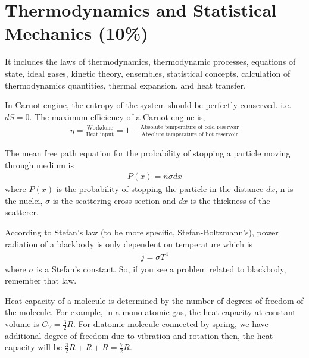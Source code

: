 
\section{Thermodynamics and Statistical Mechanics (10\%)}

It includes the laws of thermodynamics, thermodynamic processes, equations of state, ideal gases, kinetic theory, ensembles, statistical concepts, calculation of thermodynamics quantities, thermal expansion, and heat transfer.


In Carnot engine, the entropy of the system should be perfectly conserved. i.e. $dS = 0$. The maximum efficiency of a Carnot engine is,
\begin{align}
\eta = \frac{\text{Workdone}}{\text{Heat input}} = 1 - \frac{\text{Absolute temperature of cold reservoir}}{\text{Absolute temperature of hot reservoir}}
\end{align}

The mean free path equation for the probability of stopping a particle moving through medium is
\begin{align}
P(x) = n \sigma dx
\end{align}
where $P(x)$ is the probability of stopping the particle in the distance $dx$, n is the nuclei, $\sigma$ is the scattering cross section and $dx$ is the thickness of the scatterer.

According to Stefan's law (to be more specific, Stefan-Boltzmann's), power radiation of a blackbody is only dependent on temperature which is
\begin{align}
j = \sigma T^{4}
\end{align}
where $\sigma$ is a Stefan's constant. So, if you see a problem related to blackbody, remember that law.

Heat capacity of a molecule is determined by the number of degrees of freedom of the molecule. For example, in a mono-atomic gas, the heat capacity at constant volume is $C_{V} = \frac{3}{2}R$. For diatomic molecule connected by spring, we have additional degree of freedom due to vibration and rotation then, the heat capacity will be $\frac{3}{2}R + R + R = \frac{7}{2}R$.

